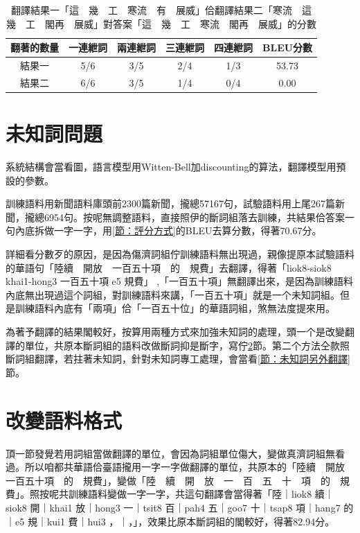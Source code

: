 \documentclass[final,oneside,onecolumn,12pt,a4paper]{book}%
\begin{document}
\begin{table}
\caption{翻譯結果一「這　幾　工　寒流　有　展威」佮翻譯結果二「寒流　這　幾　工　閣再　展威」對答案「這　幾　工　寒流　閣再　展威」的分數}%
\label{表：範例BLEU分數}
\centering
\begin{tabular}{|c|cccc|c|}
\hline
翻著的數量 & 一連紲詞 & 兩連紲詞 & 三連紲詞 & 四連紲詞 & BLEU分數\\
\hline
結果一 & 5/6 & 3/5 & 2/4 & 1/3 & 53.73\\
\hline
結果二 & 6/6 & 3/5 & 1/4 & 0/4 & 0.00\\
\hline
\end{tabular}
\end{table}


\section{未知詞問題}
\label{節：未知詞問題}
系統結構會當看圖，語言模型用Witten-Bell加discounting的算法，翻譯模型用預設的參數。

訓練語料用新聞語料庫頭前2300篇新聞，攏總57167句，試驗語料用上尾267篇新聞，攏總6954句。按呢無調整語料，直接照伊的斷詞組落去訓練，共結果佮答案一句內底拆做一字一字，用\ref{節：評分方式}的BLEU去算分數，得著70.67分。

詳細看分數歹的原因，是因為傷濟詞組佇訓練語料無出現過，親像提原本試驗語料的華語句「陸續　開放　一百五十項　的　規費」去翻譯，得著「liok8-siok8 khai1-hong3 一百五十項 e5 規費」 ,「一百五十項」無翻譯出來，是因為訓練語料內底無出現過這个詞組，對訓練語料來講，「一百五十項」就是一个未知詞組。但是訓練語料內底有「兩項」佮「一百五十位」的華語詞組，煞無法度提來用。

為著予翻譯的結果閣較好，按算用兩種方式來加強未知詞的處理，頭一个是改變翻譯的單位，共原本斷詞組的語料改做斷詞抑是斷字，寫佇\ref{節：改變語料格式}節。第二个方法仝款照斷詞組翻譯，若拄著未知詞，針對未知詞專工處理，會當看\ref{節：未知詞另外翻譯}節。



\section{改變語料格式}
\label{節：改變語料格式}

頂一節發覺若用詞組當做翻譯的單位，會因為詞組單位傷大，變做真濟詞組無看過。所以咱都共華語佮臺語攏用一字一字做翻譯的單位，共原本的「陸續　開放　一百五十項　的　規費」，變做「陸　續　開　放　一　百　五　十　項　的　規　費」。照按呢共訓練語料變做一字一字，共這句翻譯會當得著「陸｜liok8 續｜siok8 開｜khai1 放｜hong3 一｜tsit8 百｜pah4 五｜goo7 十｜tsap8 項｜hang7 的｜e5 規｜kui1 費｜hui3 ，｜，」，效果比原本斷詞組的閣較好，得著82.94分。
\end{document}
